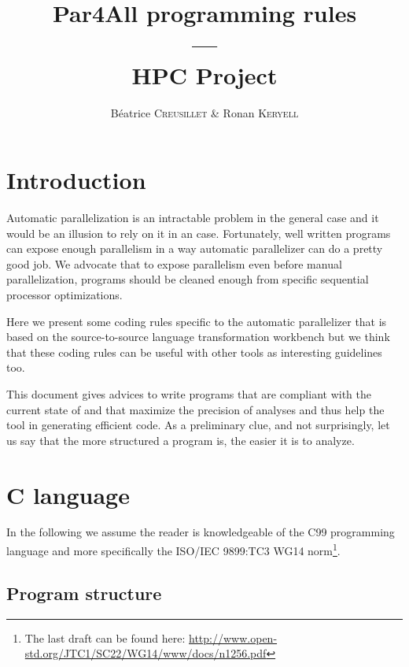 \documentclass[a4paper]{article}
\begin{document}
\title{Par4All programming rules\\
  ---\\
  HPC Project}

\author{Béatrice \textsc{Creusillet} \& Ronan \textsc{Keryell}}

\maketitle

\tableofcontents{}



\section{Introduction}
\label{sec:introduction}

Automatic parallelization is an intractable problem in the general case
and it would be an illusion to rely on it in an case. Fortunately, well
written programs can expose enough parallelism in a way automatic
parallelizer can do a pretty good job. We advocate that to expose
parallelism even before manual parallelization, programs should be cleaned
enough from specific sequential processor optimizations.

Here we present some coding rules specific to the \Apfa automatic
parallelizer that is based on the \Apips source-to-source language
transformation workbench but we think that these coding rules can be
useful with other tools as interesting guidelines too.

This document gives advices to write programs that are compliant with the
current state of \Apips and that maximize the precision of analyses and
thus help the tool in generating efficient code. As a preliminary clue,
and not surprisingly, let us say that the more structured a program is,
the easier it is to analyze.


\section{C language}
\label{sec:c-language}

In the following we assume the reader is knowledgeable of the C99
programming language and more specifically the ISO/IEC 9899:TC3 WG14
norm\footnote{The last draft can be found here:
  \url{http://www.open-std.org/JTC1/SC22/WG14/www/docs/n1256.pdf}}.


\subsection{Program structure}
\label{sec:program-structure}
\end{document}
